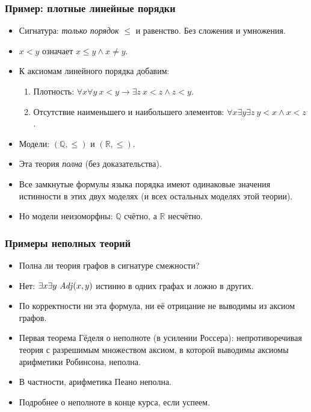 \documentclass[10pt]{beamer}
\begin{document}
\begin{frame}
    \frametitle{Пример: плотные линейные порядки}
    \begin{itemize}
        \item Сигнатура: \emph{только порядок} $\le$ и равенство. Без сложения и умножения.
        \item $x<y$ означает $x\le y\land x\ne y$.
        \item К аксиомам линейного порядка добавим:
        \begin{enumerate}
            \item Плотность:
            $\forall x\forall y~x<y\to\exists z~x<z\land z<y$.
            \item Отсутствие наименьшего и наибольшего элементов:
            $\forall x\exists y\exists z~y<x\land x<z$.
        \end{enumerate}
        \pause
        \item Модели: $(\mathbb{Q},\le)$ и $(\mathbb{R},\le)$.
        \item Эта теория \emph{полна} (без доказательства). \pause
        \item Все замкнутые формулы языка порядка имеют одинаковые значения истинности в этих двух моделях (и всех остальных моделях этой теории).
        \item Но модели неизоморфны: $\mathbb{Q}$ счётно, а $\mathbb{R}$ несчётно.
    \end{itemize}
\end{frame}

\begin{frame}
    \frametitle{Примеры неполных теорий}
    \begin{itemize}
        \item Полна ли теория графов в сигнатуре смежности? \pause
        \item Нет: $\exists x\exists y~\mathit{Adj}(x,y)$ истинно в одних графах и ложно в других.
        \item По корректности ни эта формула, ни её отрицание не выводимы из аксиом графов.
        \pause
        \item Первая теорема Гёделя о неполноте (в усилении Россера): непротиворечивая теория с разрешимым множеством аксиом, в которой выводимы аксиомы арифметики Робинсона, неполна.
        \item В частности, арифметика Пеано неполна.
        \item Подробнее о неполноте в конце курса, если успеем.
    \end{itemize}
\end{frame}
\end{document}
